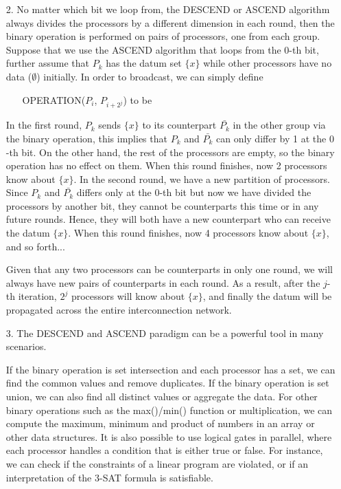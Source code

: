 \documentclass[11pt]{article}
\begin{document}
  \begin{enumerate}[leftmargin=*]
    \item[2.] No matter which bit we loop from, the D\footnotesize ESCEND \normalsize or A\footnotesize SCEND \normalsize algorithm always divides the processors by a different dimension in each round, then the binary operation is performed on pairs of processors, one from each group. Suppose that we use the A\footnotesize SCEND \normalsize algorithm that loops from the $0$-th bit, further assume that $P_k$ has the datum set $\{x\}$ while other processors have no data ($\emptyset$) initially. In order to broadcast, we can simply define
    \begin{enumerate}
        \item[] O\footnotesize PERATION\normalsize($P_i$, $P_{i+2^j}$) to be 
    \end{enumerate}

    In the first round, $P_k$ sends $\{x\}$ to its counterpart $\bar{P_{k}}$ in the other group via the binary operation, this implies that $P_k$ and $\bar{P_{k}}$ can only differ by 1 at the $0$-th bit. On the other hand, the rest of the processors are empty, so the binary operation has no effect on them. When this round finishes, now 2 processors know about $\{x\}$. In the second round, we have a new partition of processors. Since $P_k$ and $\bar{P_{k}}$ differs only at the $0$-th bit but now we have divided the processors by another bit, they cannot be counterparts this time or in any future rounds. Hence, they will both have a new counterpart who can receive the datum $\{x\}$. When this round finishes, now 4 processors know about $\{x\}$, and so forth...

    Given that any two processors can be counterparts in only one round, we will always have new pairs of counterparts in each round. As a result, after the $j$-th iteration, $2^j$ processors will know about $\{x\}$, and finally the datum will be propagated across the entire interconnection network.

    \item[3.] The D\footnotesize ESCEND \normalsize and A\footnotesize SCEND \normalsize paradigm can be a powerful tool in many scenarios.

    If the binary operation is set intersection and each processor has a set, we can find the common values and remove duplicates. If the binary operation is set union, we can also find all distinct values or aggregate the data. For other binary operations such as the max()/min() function or multiplication, we can compute the maximum, minimum and product of numbers in an array or other data structures. It is also possible to use logical gates in parallel, where each processor handles a condition that is either true or false. For instance, we can check if the constraints of a linear program are violated, or if an interpretation of the 3-SAT formula is satisfiable.

  \end{enumerate}




  \vspace{8mm}
  \printbibliography
\end{document}
